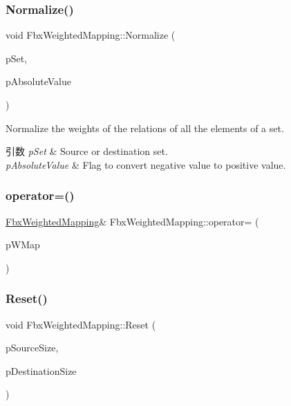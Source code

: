 \subsubsection{\texorpdfstring{Normalize()}{Normalize()}}
{\footnotesize\ttfamily void Fbx\+Weighted\+Mapping\+::\+Normalize (\begin{DoxyParamCaption}\item[{\hyperlink{class_fbx_weighted_mapping_a3fb59c162b0c5b278f00e7bad4c578c6}{E\+Set}}]{p\+Set,  }\item[{bool}]{p\+Absolute\+Value }\end{DoxyParamCaption})}

Normalize the weights of the relations of all the elements of a set. 
\begin{DoxyParams}{引数}
{\em p\+Set} & Source or destination set. \\
\hline
{\em p\+Absolute\+Value} & Flag to convert negative value to positive value. \\
\hline
\end{DoxyParams}
\mbox{\label{class_fbx_weighted_mapping_a7cf51cc13e95c389364fbfb8d7847c2d}} 
\subsubsection{\texorpdfstring{operator=()}{operator=()}}
{\footnotesize\ttfamily \hyperlink{class_fbx_weighted_mapping}{Fbx\+Weighted\+Mapping}\& Fbx\+Weighted\+Mapping\+::operator= (\begin{DoxyParamCaption}\item[{const \hyperlink{class_fbx_weighted_mapping}{Fbx\+Weighted\+Mapping} \&}]{p\+W\+Map }\end{DoxyParamCaption})}

\mbox{\label{class_fbx_weighted_mapping_ae0bba66321c38e91d5910cfb0306dc57}} 
\subsubsection{\texorpdfstring{Reset()}{Reset()}}
{\footnotesize\ttfamily void Fbx\+Weighted\+Mapping\+::\+Reset (\begin{DoxyParamCaption}\item[{int}]{p\+Source\+Size,  }\item[{int}]{p\+Destination\+Size }\end{DoxyParamCaption})}

